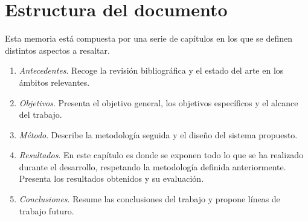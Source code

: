 \section{Estructura del documento}

Esta memoria está compuesta por una serie de capítulos en los que se definen distintos 
aspectos a resaltar.

\begin{enumerate}
    \item \emph{Antecedentes}. Recoge la revisión bibliográfica y el estado del 
    arte en los ámbitos relevantes.
    \item \emph{Objetivos}. Presenta el objetivo general, los objetivos específicos 
    y el alcance del trabajo.
    \item \emph{Método}. Describe la metodología seguida y el diseño del sistema propuesto.
    \item \emph{Resultados}. En este capítulo es donde se exponen todo lo que se ha 
    realizado durante el desarrollo, respetando la metodología definida anteriormente. 
    Presenta los resultados obtenidos y su evaluación.
    \item \emph{Conclusiones}. Resume las conclusiones del trabajo y propone líneas de 
    trabajo futuro.
\end{enumerate}